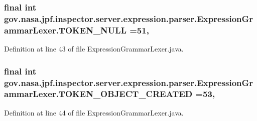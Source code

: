 \subsubsection[{\texorpdfstring{T\+O\+K\+E\+N\+\_\+\+N\+U\+LL}{TOKEN_NULL}}]{\setlength{\rightskip}{0pt plus 5cm}final int gov.\+nasa.\+jpf.\+inspector.\+server.\+expression.\+parser.\+Expression\+Grammar\+Lexer.\+T\+O\+K\+E\+N\+\_\+\+N\+U\+LL =51\hspace{0.3cm}{\ttfamily [static]}, {\ttfamily [package]}}\hypertarget{classgov_1_1nasa_1_1jpf_1_1inspector_1_1server_1_1expression_1_1parser_1_1_expression_grammar_lexer_af93f9e4e2c92cf495418e06ed9f2f147}{}\label{classgov_1_1nasa_1_1jpf_1_1inspector_1_1server_1_1expression_1_1parser_1_1_expression_grammar_lexer_af93f9e4e2c92cf495418e06ed9f2f147}


Definition at line 43 of file Expression\+Grammar\+Lexer.\+java.

\subsubsection[{\texorpdfstring{T\+O\+K\+E\+N\+\_\+\+O\+B\+J\+E\+C\+T\+\_\+\+C\+R\+E\+A\+T\+ED}{TOKEN_OBJECT_CREATED}}]{\setlength{\rightskip}{0pt plus 5cm}final int gov.\+nasa.\+jpf.\+inspector.\+server.\+expression.\+parser.\+Expression\+Grammar\+Lexer.\+T\+O\+K\+E\+N\+\_\+\+O\+B\+J\+E\+C\+T\+\_\+\+C\+R\+E\+A\+T\+ED =53\hspace{0.3cm}{\ttfamily [static]}, {\ttfamily [package]}}\hypertarget{classgov_1_1nasa_1_1jpf_1_1inspector_1_1server_1_1expression_1_1parser_1_1_expression_grammar_lexer_ad2e5e3041a237f7be7033d43e181a16d}{}\label{classgov_1_1nasa_1_1jpf_1_1inspector_1_1server_1_1expression_1_1parser_1_1_expression_grammar_lexer_ad2e5e3041a237f7be7033d43e181a16d}


Definition at line 44 of file Expression\+Grammar\+Lexer.\+java.

